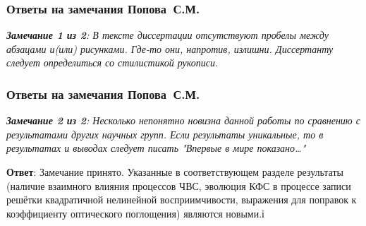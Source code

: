 \begin{frame}
	\frametitle{Ответы на замечания Попова~С.М.}
	\small{\textit{\textbf{Замечание 1 из 2}: В тексте диссертации отсутствуют пробелы между абзацами и(или) рисунками. Где-то они, напротив, излишни. Диссертанту следует определиться со стилистикой рукописи.}}
	
	\hfill

\end{frame}


\begin{frame}
	\frametitle{Ответы на замечания Попова~С.М.}
	\small{\textit{\textbf{Замечание 2 из 2}: Несколько непонятно новизна данной работы по сравнению с результатами других научных групп. Если результаты уникальные, то в результатах и выводах следует писать "Впервые в мире показано…"}}
	
	\hfill
	
	\textbf{Ответ}: Замечание принято. Указанные в соответствующем разделе результаты (наличие взаимного влияния процессов ЧВС, эволюция КФС в процессе записи решётки квадратичной нелинейной восприимчивости, выражения для поправок к коэффициенту оптического поглощения) являются новыми.і
\end{frame}